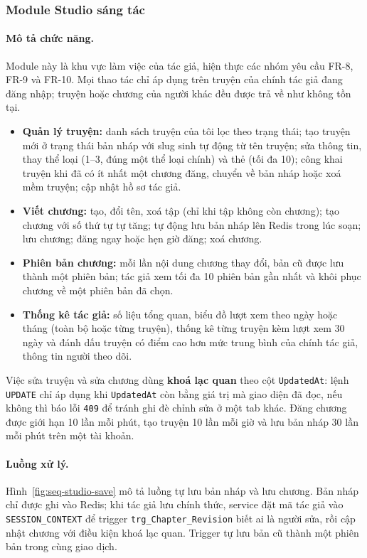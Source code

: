\subsubsection{Module Studio sáng tác}
\label{subsubsec:feature-studio}

\paragraph{Mô tả chức năng.} Module này là khu vực làm việc của tác giả, hiện thực các nhóm yêu cầu FR-8, FR-9 và FR-10. Mọi thao tác chỉ áp dụng trên truyện của chính tác giả đang đăng nhập; truyện hoặc chương của người khác đều được trả về như không tồn tại.
\begin{itemize}
    \item \textbf{Quản lý truyện:} danh sách truyện của tôi lọc theo trạng thái; tạo truyện mới ở trạng thái bản nháp với slug sinh tự động từ tên truyện; sửa thông tin, thay thể loại (1--3, đúng một thể loại chính) và thẻ (tối đa 10); công khai truyện khi đã có ít nhất một chương đăng, chuyển về bản nháp hoặc xoá mềm truyện; cập nhật hồ sơ tác giả.
    \item \textbf{Viết chương:} tạo, đổi tên, xoá tập (chỉ khi tập không còn chương); tạo chương với số thứ tự tự tăng; tự động lưu bản nháp lên Redis trong lúc soạn; lưu chương; đăng ngay hoặc hẹn giờ đăng; xoá chương.
    \item \textbf{Phiên bản chương:} mỗi lần nội dung chương thay đổi, bản cũ được lưu thành một phiên bản; tác giả xem tối đa 10 phiên bản gần nhất và khôi phục chương về một phiên bản đã chọn.
    \item \textbf{Thống kê tác giả:} số liệu tổng quan, biểu đồ lượt xem theo ngày hoặc tháng (toàn bộ hoặc từng truyện), thống kê từng truyện kèm lượt xem 30 ngày và đánh dấu truyện có điểm cao hơn mức trung bình của chính tác giả, thông tin người theo dõi.
\end{itemize}
Việc sửa truyện và sửa chương dùng \textbf{khoá lạc quan} theo cột \texttt{UpdatedAt}: lệnh \texttt{UPDATE} chỉ áp dụng khi \texttt{UpdatedAt} còn bằng giá trị mà giao diện đã đọc, nếu không thì báo lỗi \texttt{409} để tránh ghi đè chỉnh sửa ở một tab khác. Đăng chương được giới hạn 10 lần mỗi phút, tạo truyện 10 lần mỗi giờ và lưu bản nháp 30 lần mỗi phút trên một tài khoản.

\paragraph{Luồng xử lý.} Hình~\ref{fig:seq-studio-save} mô tả luồng tự lưu bản nháp và lưu chương. Bản nháp chỉ được ghi vào Redis; khi tác giả lưu chính thức, service đặt mã tác giả vào \texttt{SESSION\_CONTEXT} để trigger \texttt{trg\_Chapter\_Revision} biết ai là người sửa, rồi cập nhật chương với điều kiện khoá lạc quan. Trigger tự lưu bản cũ thành một phiên bản trong cùng giao dịch.

